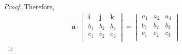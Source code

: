 \documentclass{article}
\begin{document}
\begin{proof}
Therefore,
\begin{align*}
    \mathbf{a} \cdot
    \begin{vmatrix}
      \mathbf{i} & \mathbf{j} & \mathbf{k} \\
      b_1 & b_2 & b_3 \\
      c_1 & c_2 & c_3 \\
    \end{vmatrix}
    =
    \begin{vmatrix}
    a_1 & a_2 & a_3 \\
    b_1 & b_2 & b_3 \\
    c_1 & c_2 & c_3 \\
    \end{vmatrix}
\end{align*}
\end{proof}
\end{document}
